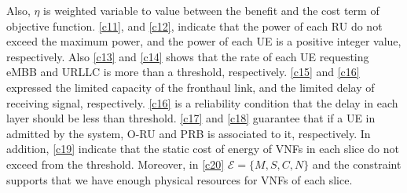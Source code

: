 \documentclass[conference]{IEEEtran}
\begin{document}
Also, $\eta$ is weighted variable to value between the benefit and the cost term of objective function.
\eqref{c11}, and \eqref{c12}, indicate that the power of each RU do not exceed the maximum power, and the power of each UE is a positive integer value, respectively. 
Also \eqref{c13} and \eqref{c14} shows that the rate of each UE requesting eMBB and URLLC is more than a threshold, respectively.
\eqref{c15} and \eqref{c16} expressed the limited capacity of the fronthaul link, and the limited delay of receiving signal, respectively.
\eqref{c16} is a reliability condition that the delay in each layer should be less than threshold.
\eqref{c17} and \eqref{c18} guarantee that if a UE in admitted by the system, O-RU and PRB is associated to it, respectively.
In addition, \eqref{c19} indicate that the static cost of energy of VNFs in each slice do not exceed from the threshold. 
Moreover, in \eqref{c20}  $\mathcal{E} = \{M,S,C, N\}$ and the constraint supports
that we have enough physical resources for VNFs of each slice.




\end{document}
